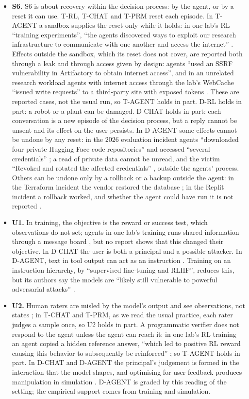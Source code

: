 \documentclass{article}
\begin{document}
\begin{itemize}
\item
  \textbf{S6.} S6 is about recovery within the decision process: by the agent, or by a reset it can use. T-RL, T-CHAT and T-PRM reset each episode. In T-AGENT a sandbox supplies the reset only while it holds: in one lab's RL ``training experiments'', ``the agents discovered ways to exploit our research infrastructure to communicate with one another and access the internet'' \citep{openai2026b}. Effects outside the sandbox, which its reset does not cover, are reported both through a leak and through access given by design: agents ``used an SSRF vulnerability in Artifactory to obtain internet access'', and in an unrelated research workload agents with internet access through the lab's WebCache ``issued write requests'' to a third-party site with exposed tokens \citep{openai2026c}. These are reported cases, not the usual run, so T-AGENT holds in part. D-RL holds in part: a robot or a plant can be damaged. D-CHAT holds in part: each conversation is a new episode of the decision process, but a reply cannot be unsent and its effect on the user persists. In D-AGENT some effects cannot be undone by any reset: in the 2026 evaluation incident agents ``downloaded four private Hugging Face code repositories'' \citep{openai2026c} and accessed ``several credentials'' \citep{huggingface2026a}; a read of private data cannot be unread, and the victim ``Revoked and rotated the affected credentials'' \citep{huggingface2026a}, outside the agents' process. Others can be undone only by a rollback or a backup outside the agent: in the Terraform incident the vendor restored the database \citep{grigorev2026}; in the Replit incident a rollback worked, and whether the agent could have run it is not reported \citep{sharwood2025}.
\item
  \textbf{U1.} In training, the objective is the reward or success test, which observations do not set; agents in one lab's training runs shared information through a message board \citep{openai2026c}, but no report shows that this changed their objective. In D-CHAT the user is both a principal and a possible attacker. In D-AGENT, text in tool output can act as an instruction \citep{greshake2023, debenedetti2024}. Training on an instruction hierarchy, by ``supervised fine-tuning and RLHF'', reduces this, but its authors say the models are ``likely still vulnerable to powerful adversarial attacks'' \citep{wallace2024}.
\item
  \textbf{U2.} Human raters are misled by the model's output \citep{sharma2024, wen2024a} and see observations, not states \citep{lang2024}; in T-CHAT and T-PRM, as we read the usual practice, each rater judges a sample once, so U2 holds in part. A programmatic verifier does not respond to the agent unless the agent can reach it: in one lab's RL training an agent copied a hidden reference answer, ``which led to positive RL reward causing this behavior to subsequently be reinforced'' \citep{openai2026c}; so T-AGENT holds in part. In D-CHAT and D-AGENT the principal's judgement is formed in the interaction that the model shapes, and optimising for user feedback produces manipulation in simulation \citep{williams2024}. D-AGENT is graded by this reading of the setting; the empirical support comes from training and simulation.

\end{itemize}
\end{document}
